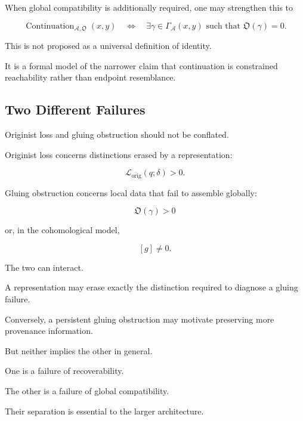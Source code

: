 \documentclass[
  11pt,
  a4paper,
  DIV=12,
  BCOR=0mm,
  parskip=half-
]{scrartcl}
\newcommand{\lossorig}{%
  \mathscr L_{\mathrm{orig}}%
}
\newcommand{\Continuation}{\operatorname{Continuation}}
\theoremstyle{definition}
\theoremstyle{plain}
\theoremstyle{remark}
\begin{document}
When global compatibility is additionally required, one may strengthen this
to

\[
  \Continuation_{\mathcal A,\mathfrak O}(x,y)
  \quad\Longleftrightarrow\quad
  \exists\gamma\in\Gamma_{\mathcal A}(x,y)
  \text{ such that }
  \mathfrak O(\gamma)=0.
\]

This is not proposed as a universal definition of identity.

It is a formal model of the narrower claim that continuation is constrained
reachability rather than endpoint resemblance.


\subsection{Two Different Failures}
\label{app:loss-vs-obstruction}

Originist loss and gluing obstruction should not be conflated.

Originist loss concerns distinctions erased by a representation:

\[
  \lossorig(q;\delta)>0.
\]

Gluing obstruction concerns local data that fail to assemble globally:

\[
  \mathfrak O(\gamma)>0
\]

or, in the cohomological model,

\[
  [g]\neq 0.
\]

The two can interact.

A representation may erase exactly the distinction required to diagnose a
gluing failure.

Conversely, a persistent gluing obstruction may motivate preserving more
provenance information.

But neither implies the other in general.

One is a failure of recoverability.

The other is a failure of global compatibility.

Their separation is essential to the larger architecture.

\end{document}
